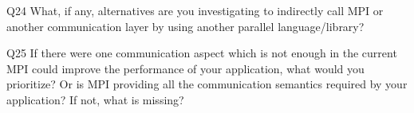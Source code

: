 \begin{description}%
\item{Q24} What, if any, alternatives are you investigating to indirectly call MPI or another communication layer by using another parallel language/library?%
\item{Q25} If there were one communication aspect which is not enough in the current MPI could improve the performance of your application, what would you prioritize? Or is MPI providing all the communication semantics required by your application? If not, what is missing?%
\end{description}%
